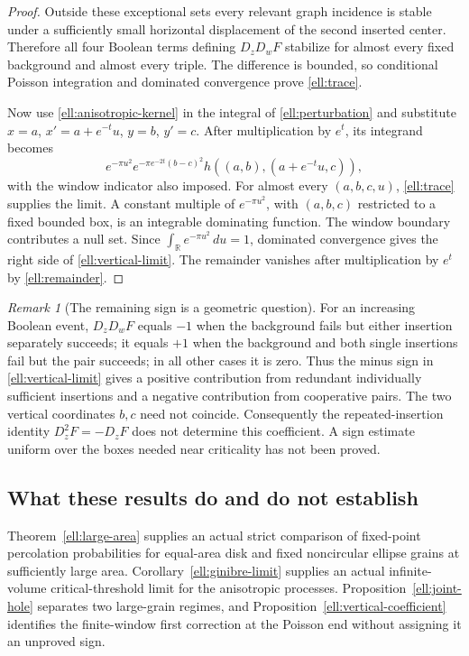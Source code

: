 \documentclass[11pt,a4paper]{article}
\theoremstyle{definition}
\theoremstyle{remark}
\newtheorem{remark}[theorem]{Remark}
\numberwithin{equation}{section}
\begin{document}
\begin{proof}
Outside these exceptional sets every relevant graph incidence
is stable under a sufficiently small horizontal displacement
of the second inserted center.  Therefore all four Boolean
terms defining $D_zD_wF$ stabilize for almost every fixed
background and almost every triple.  The difference is bounded,
so conditional Poisson integration and dominated convergence
prove \eqref{ell:trace}.

Now use \eqref{ell:anisotropic-kernel} in the integral of
\eqref{ell:perturbation} and substitute $x=a$,
$x'=a+e^{-t}u$, $y=b$, $y'=c$.  After multiplication by
$e^t$, its integrand becomes
\[
 e^{-\pi u^2}e^{-\pi e^{-2t}(b-c)^2}
       h((a,b),(a+e^{-t}u,c)),
\]
with the window indicator also imposed.  For almost every
$(a,b,c,u)$, \eqref{ell:trace} supplies the limit.  A constant
multiple of $e^{-\pi u^2}$, with $(a,b,c)$ restricted to a
fixed bounded box, is an integrable dominating function.
The window boundary contributes a null set.  Since
$\int_{\mathbb R}e^{-\pi u^2}\,du=1$, dominated convergence
gives the right side of \eqref{ell:vertical-limit}.  The
remainder vanishes after multiplication by $e^t$ by
\eqref{ell:remainder}.
\end{proof}

\begin{remark}[The remaining sign is a geometric question]
\label{ell:vertical-scope}
For an increasing Boolean event, $D_zD_wF$ equals $-1$ when
the background fails but either insertion separately succeeds;
it equals $+1$ when the background and both single insertions
fail but the pair succeeds; in all other cases it is zero.
Thus the minus sign in \eqref{ell:vertical-limit} gives a
positive contribution from redundant individually sufficient
insertions and a negative contribution from cooperative pairs.
The two vertical coordinates $b,c$ need not coincide.
Consequently the repeated-insertion identity $D_z^2F=-D_zF$
does not determine this coefficient.  A sign estimate uniform
over the boxes needed near criticality has not been proved.
\end{remark}

\subsection{What these results do and do not establish}

Theorem~\ref{ell:large-area} supplies an actual strict comparison
of fixed-point percolation probabilities for equal-area disk
and fixed noncircular ellipse grains at sufficiently large
area.  Corollary~\ref{ell:ginibre-limit} supplies an actual
infinite-volume critical-threshold limit for the anisotropic
processes.  Proposition~\ref{ell:joint-hole} separates two
large-grain regimes, and Proposition~\ref{ell:vertical-coefficient}
identifies the finite-window first correction at the Poisson
end without assigning it an unproved sign.
\end{document}
